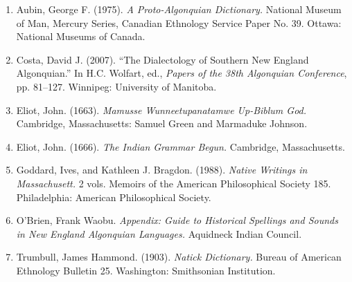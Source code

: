 \begin{enumerate}

\item Aubin, George F. (1975). \emph{A Proto-Algonquian Dictionary.} National
Museum of Man, Mercury Series, Canadian Ethnology Service Paper No. 39.
Ottawa: National Museums of Canada.

\item Costa, David J. (2007). ``The Dialectology of Southern New England
Algonquian.'' In H.C. Wolfart, ed., \emph{Papers of the 38th Algonquian
Conference}, pp. 81--127. Winnipeg: University of Manitoba.

\item Eliot, John. (1663). \emph{Mamusse Wunneetupanatamwe Up-Biblum God.}
Cambridge, Massachusetts: Samuel Green and Marmaduke Johnson.

\item Eliot, John. (1666). \emph{The Indian Grammar Begun.} Cambridge,
Massachusetts.

\item Goddard, Ives, and Kathleen J. Bragdon. (1988). \emph{Native Writings
in Massachusett.} 2 vols. Memoirs of the American Philosophical Society 185.
Philadelphia: American Philosophical Society.

\item O'Brien, Frank Waobu. \emph{Appendix: Guide to Historical Spellings
and Sounds in New England Algonquian Languages.} Aquidneck Indian Council.

\item Trumbull, James Hammond. (1903). \emph{Natick Dictionary.} Bureau of
American Ethnology Bulletin 25. Washington: Smithsonian Institution.

\end{enumerate}
